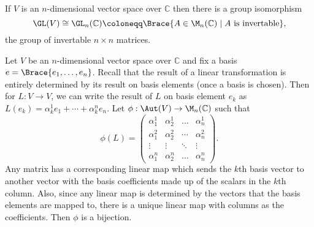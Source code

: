 \documentclass[../Project.tex]{subfiles}
\begin{document}
\begin{prop}
	 If $V$ is an $n$-dimensional vector space over $\mathbb{C}$ then there is a group isomorphism
	$$\GL(V) \cong \GL_n(\mathbb{C}) \coloneqq \Brace{A \in \M_n(\mathbb{C}) \;|\; A \text{ is invertable}},$$
	the group of invertable $n \times n$ matrices.
\end{prop}
\begin{proo*}
	Let $V$ be an $n$-dimensional vector space over $\mathbb{C}$ and fix a basis $e = \Brace{e_1,\dots,e_n}$. Recall that the result of a linear transformation is entirely determined by its result on basis elements (once a basis is chosen). Then for $L : V \to V$, we can write the result of $L$ on basis element $e_k$ as $L(e_k) = \alpha^1_ke_1 + \cdots + \alpha^n_ke_n$. Let $\phi : \Aut(V) \to \M_n(\mathbb{C})$ such that
	$$\phi(L) =
	\begin{pmatrix} 
	    \alpha^1_1 & \alpha^1_2 & \dots & \alpha^1_n \\
	    \alpha^2_1 & \alpha^2_2 & \cdots & \alpha^2_n \\
	    \vdots & \vdots& \ddots & \vdots\\
	    \alpha^n_1 & \alpha^n_2  &\dots & \alpha^n_n 
	\end{pmatrix}.$$
	Any matrix has a corresponding linear map which sends the $k$th basis vector to another vector with the basis coefficients made up of the scalars in the $k$th column. Also, since any linear map is determined by the vectors that the basis elements are mapped to, there is a unique linear map with columns as the coefficients. Then $\phi$ is a bijection.\\


\end{proo*}
\end{document}
